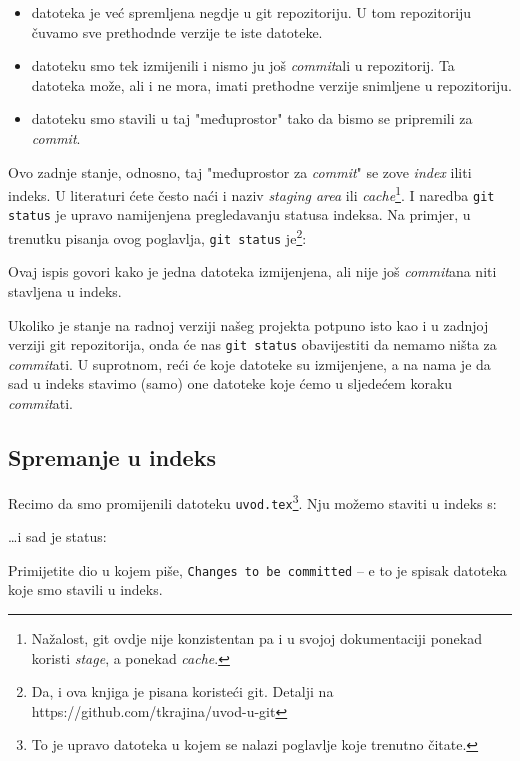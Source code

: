 \begin{itemize}
	\item datoteka je već spremljena negdje u git repozitoriju. U tom repozitoriju čuvamo sve prethodnde verzije te iste datoteke.
	\item datoteku smo tek izmijenili i nismo ju još \emph{commit}ali u repozitorij. Ta datoteka može, ali i ne mora, imati prethodne verzije snimljene u repozitoriju.
	\item datoteku smo stavili u taj "međuprostor" tako da bismo se pripremili za \emph{commit}.
\end{itemize}

Ovo zadnje stanje, odnosno, taj "međuprostor za \emph{commit}" se zove \emph{index} iliti indeks.
U literaturi ćete često naći i naziv \emph{staging area} ili \emph{cache}\footnote{Nažalost, git ovdje nije konzistentan pa i u svojoj dokumentaciji ponekad koristi \emph{stage}, a ponekad \emph{cache}.}.
I naredba \verb+git status+ je upravo namijenjena pregledavanju statusa indeksa.
Na primjer, u trenutku pisanja ovog poglavlja, \verb+git status+ je\footnote{Da, i ova knjiga je pisana koristeći git. Detalji na https://github.com/tkrajina/uvod-u-git}:



Ovaj ispis govori kako je jedna datoteka izmijenjena, ali nije još \emph{commit}ana niti stavljena u indeks.

Ukoliko je stanje na radnoj verziji našeg projekta potpuno isto kao i u zadnjoj verziji git repozitorija, onda će nas \verb+git status+ obavijestiti da nemamo ništa za \emph{commit}ati.
U suprotnom, reći će koje datoteke su izmijenjene, a na nama je da sad u indeks stavimo (samo) one datoteke koje ćemo u sljedećem koraku \emph{commit}ati.

\subsection*{Spremanje u indeks}

Recimo da smo promijenili datoteku \verb+uvod.tex+\footnote{To je upravo datoteka u kojem se nalazi poglavlje koje trenutno čitate.}.
Nju možemo staviti u indeks s:


\dots{}i sad je status:



Primijetite dio u kojem piše, \verb+Changes to be committed+ -- e to je spisak datoteka koje smo stavili u indeks.

